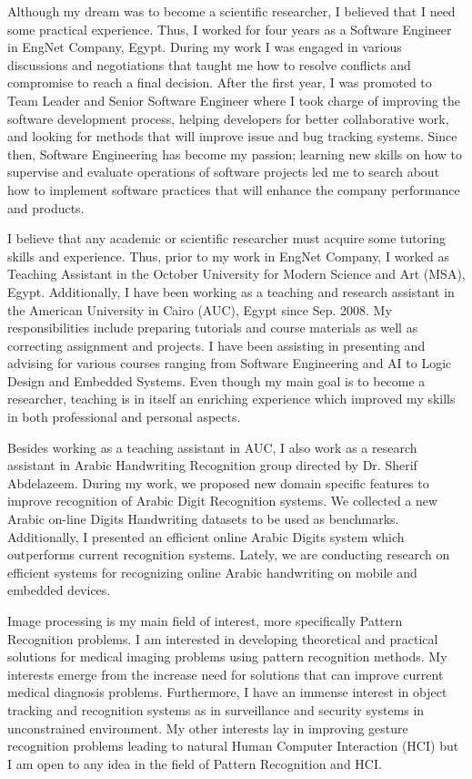 \documentclass[10pt]{article}%
\begin{document}
 	Although my dream was to become a scientific researcher, I believed that I need some practical experience. Thus, I worked for four years as a Software Engineer in EngNet Company, Egypt. During my work I was engaged in various discussions and negotiations that taught me how to resolve conflicts and compromise to reach a final decision. After the first year, I was promoted to Team Leader and Senior Software Engineer where I took charge of improving the software development process, helping developers for better collaborative work, and looking for methods that will improve issue and bug tracking systems. Since then, Software Engineering has become my passion; learning new skills on how to supervise and evaluate operations of software projects led me to search about how to implement software practices that will enhance the company performance and products.

I believe that any academic or scientific researcher must acquire some tutoring skills and experience. Thus, prior to my work in EngNet Company, I worked as Teaching Assistant in the October University for Modern Science and Art (MSA), Egypt. Additionally, I have been working as a teaching and research assistant in the American University in Cairo (AUC), Egypt since Sep. 2008. My responsibilities include preparing tutorials and course materials as well as correcting assignment and projects. I have been assisting in presenting and advising for various courses ranging from Software Engineering and AI to Logic Design and Embedded Systems. Even though my main goal is to become a researcher, teaching is in itself an enriching experience which improved my skills in both professional and personal aspects.

 
 	Besides working as a teaching assistant in AUC, I also work as a research assistant in Arabic Handwriting Recognition group directed by Dr. Sherif Abdelazeem. During my work, we proposed new domain specific features to improve recognition of Arabic Digit Recognition systems. We collected a new Arabic on-line Digits Handwriting datasets to be used as benchmarks. Additionally, I presented an efficient online Arabic Digits system which outperforms current recognition systems.  Lately, we are conducting research on efficient systems for recognizing online Arabic handwriting on mobile and embedded devices. 


 
 Image processing is my main field of interest, more specifically Pattern Recognition problems. I am interested in developing theoretical and practical solutions for medical imaging problems using pattern recognition methods. My interests emerge from the increase need for solutions that can improve current medical diagnosis problems.  Furthermore, I have an immense interest in object tracking and recognition systems as in surveillance and security systems in unconstrained environment. My other interests lay in improving gesture recognition problems leading to natural Human Computer Interaction (HCI) but I am open to any idea in the field of Pattern Recognition and HCI. 
\end{document}
